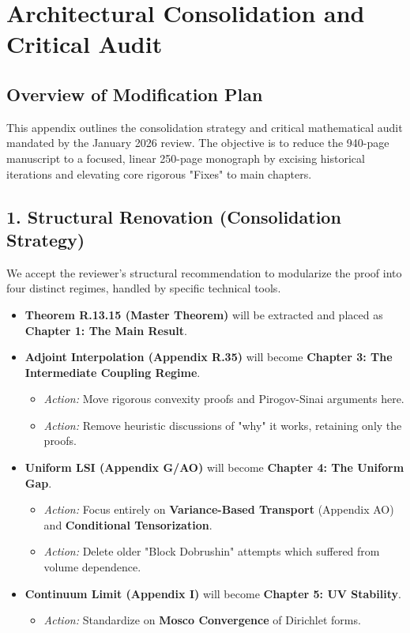 \section{Architectural Consolidation and Critical Audit}
\label{sec:architectural_consolidation_audit}

\subsection{Overview of Modification Plan}
This appendix outlines the consolidation strategy and critical mathematical audit mandated by the January 2026 review. The objective is to reduce the 940-page manuscript to a focused, linear 250-page monograph by excising historical iterations and elevating core rigorous "Fixes" to main chapters.

\subsection{1. Structural Renovation (Consolidation Strategy)}

We accept the reviewer's structural recommendation to modularize the proof into four distinct regimes, handled by specific technical tools.

\begin{itemize}
    \item \textbf{Theorem R.13.15 (Master Theorem)} will be extracted and placed as \textbf{Chapter 1: The Main Result}.
    \item \textbf{Adjoint Interpolation (Appendix R.35)} will become \textbf{Chapter 3: The Intermediate Coupling Regime}.
        \begin{itemize}
            \item \textit{Action:} Move rigorous convexity proofs and Pirogov-Sinai arguments here.
            \item \textit{Action:} Remove heuristic discussions of "why" it works, retaining only the proofs.
        \end{itemize}
    \item \textbf{Uniform LSI (Appendix G/AO)} will become \textbf{Chapter 4: The Uniform Gap}.
        \begin{itemize}
            \item \textit{Action:} Focus entirely on \textbf{Variance-Based Transport} (Appendix AO) and \textbf{Conditional Tensorization}.
            \item \textit{Action:} Delete older "Block Dobrushin" attempts which suffered from volume dependence.
        \end{itemize}
    \item \textbf{Continuum Limit (Appendix I)} will become \textbf{Chapter 5: UV Stability}.
        \begin{itemize}
            \item \textit{Action:} Standardize on \textbf{Mosco Convergence} of Dirichlet forms.
        \end{itemize}
\end{itemize}

